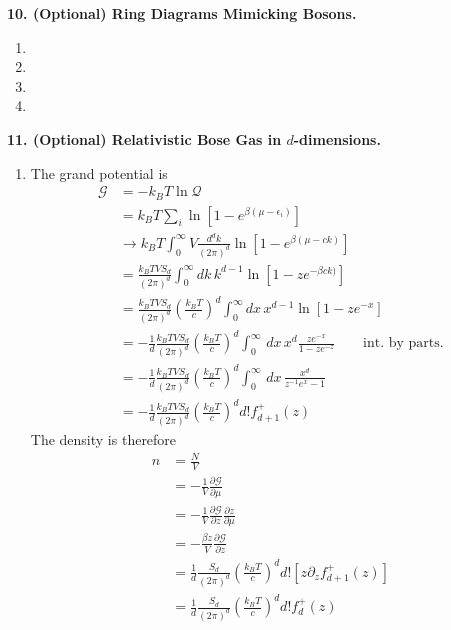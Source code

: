 \documentclass{article}
\theoremstyle{definition}
\newcommand{\p}{\partial}
\newcommand{\be}{\beta}
\newcommand{\f}[2]{\frac{#1}{#2}}
\newcommand{\lp}{\left(}
\newcommand{\rp}{\right)}
\newcommand{\lb}{\left[}
\newcommand{\rb}{\right]}
\begin{document}
\noindent \textbf{10. (Optional) Ring Diagrams Mimicking Bosons.}

\begin{enumerate}[label=(\alph*)]
	\item 
	
	\item 
	
	\item 
	
	\item 

\end{enumerate}



\noindent \textbf{11. (Optional) Relativistic Bose Gas in $d$-dimensions.}

\begin{enumerate}[label=(\alph*)]
	\item The grand potential is 
	\begin{align*}
	\mathcal{G}
	&= -k_B T \ln \mathcal{Q} \\
	&= k_B T \sum_{i} \ln \lb 1 - e^{\be(\mu - \epsilon_i)} \rb \\
	&\to k_B T \int_0^\infty V \f{d^d k }{(2\pi)^d} \ln \lb 1 - e^{\be(\mu -  ck)} \rb \\
	&= \f{k_B T V S_d }{(2\pi)^d}\int_0^\infty  dk\, k^{d-1} \ln \lb 1 - z e^{-\be  ck)} \rb \\
	&= \f{k_B T V S_d }{(2\pi)^d}\lp \f{k_B T}{c} \rp^d\int_0^\infty  dx\, x^{d-1} \ln \lb 1 - z e^{-x} \rb \\
	&= -\f{1}{d}\f{k_B T V S_d }{(2\pi)^d}\lp \f{k_B T}{c} \rp^d\int_0^\infty 
	\,dx \, x^d \f{ze^{-x}}{1 - ze^{-z}}  
	\quad\quad \text{int. by parts.}\\
	&= -\f{1}{d}\f{k_B T V S_d }{(2\pi)^d}\lp \f{k_B T}{c} \rp^d
	\int_0^\infty \,dx \, \f{x^d}{z^{-1}e^x - 1}  \\
	&= \boxed{-\f{1}{d}\f{k_B T V S_d }{(2\pi)^d}\lp \f{k_B T}{c} \rp^d d! f_{d+1}^+(z)}
	\end{align*}
	The density is therefore
	\begin{align*}
	n &= \f{N}{V} \\
	&= -\f{1}{V}\f{\p \mathcal{G}}{\p \mu} \\
	&= -\f{1}{V}\f{\p \mathcal{G}}{\p z}\f{\p z}{\p \mu} \\
	&= -\f{\be z}{V}\f{\p \mathcal{G}}{\p z} \\
	&= \f{1}{d}\f{S_d }{(2\pi)^d}\lp \f{k_B T}{c} \rp^d d![ z\p_zf_{d+1}^+(z)]\\
	&= \boxed{\f{1}{d}\f{S_d }{(2\pi)^d}\lp \f{k_B T}{c} \rp^d d! f_d^+(z)}
	\end{align*}
	

\end{enumerate}
\end{document}

